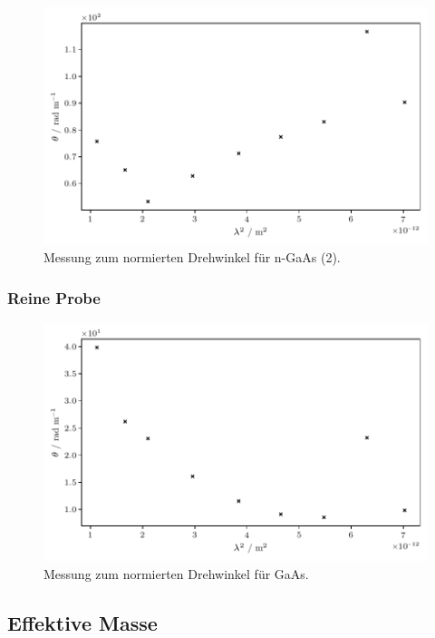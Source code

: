 \begin{figure}[H]
    \centering
    \includegraphics{build/doped-2.pdf}
    \caption{Messung zum normierten Drehwinkel für n-GaAs (2).}
    \label{fig:dotiert-2}
\end{figure}

\subsubsection{Reine Probe}

\begin{figure}[H]
    \centering
    \includegraphics{build/pure.pdf}
    \caption{Messung zum normierten Drehwinkel für GaAs.}
    \label{fig:rein}
\end{figure}

\subsection{Effektive Masse}

